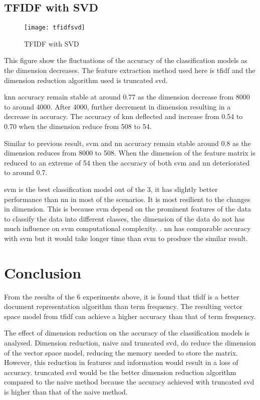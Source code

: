 \subsection{TFIDF with SVD}
\begin{figure} [ht]
	\centering
	\texttt{[image: tfidfsvd]}
	\caption{TFIDF with SVD}
	\label{fig:tfidfSVD}
\end{figure}

This figure show the fluctuations of the accuracy of the classification models as the dimension decreases. The feature extraction method used here is \ac{tfidf} and the dimension reduction algorithm used is truncated \ac{svd}.

\Ac{knn} accuracy remain stable at around 0.77 as the dimension decrease from 8000 to around 4000. After 4000, further decrement in dimension resulting in a decrease in accuracy. The accuracy of \ac{knn} deflected and increase from 0.54 to 0.70 when the dimension reduce from 508 to 54.

Similar to previous result, \ac{svm} and \ac{nn} accuracy remain stable around 0.8 as the dimension reduces from 8000 to 508. When the dimension of the feature matrix is reduced to an extreme of 54 then the accuracy of both \ac{svm} and \ac{nn} deteriorated to around 0.7.

\Ac{svm} is the best classification model out of the 3, it has slightly better performance than \ac{nn} in most of the scenarios. It is most resilient to the changes in dimension. This is because \ac{svm} depend on the prominent features of the data to classify the data into different classes, the dimension of the data do not has much influence on \ac{svm} computational complexity. \cite{dimRedCat}. \Ac{nn} has comparable accuracy with \ac{svm} but it would take longer time than \ac{svm} to produce the similar result.


\section{Conclusion}
From the results of the 6 experiments above, it is found that \ac{tfidf} is a better document representation algorithm than term frequency. The resulting vector space model from \ac{tfidf} can achieve a higher accuracy than that of term frequency. 

The effect of dimension reduction on the accuracy of the classification models is analysed. Dimension reduction, naive and truncated \ac{svd}, do reduce the dimension of the vector space model, reducing the memory needed to store the matrix. However, this reduction in features and information would result in a loss of accuracy. truncated \ac{svd} would be the better dimension reduction algorithm compared to the naive method because the accuracy achieved with truncated \ac{svd} is higher than that of the naive method.

